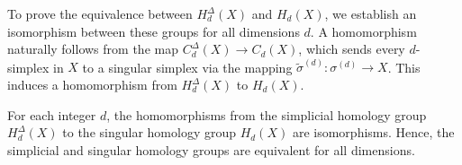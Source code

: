 To prove the equivalence between $H^{\Delta}_{d}(X)$ and $H_{d}(X)$, we establish an isomorphism between these groups for all dimensions $d$. A homomorphism naturally follows from the map $C^{\Delta}_{d}(X) \rightarrow C_{d}(X)$, which sends every $d$-simplex in $X$ to a singular simplex via the mapping $\tilde{\sigma}^{(d)}: \sigma^{(d)}\rightarrow X$. This induces a homomorphism from $H^{\Delta}_{d}(X)$ to $H_{d}(X)$.

\begin{theorem}{\cite[p.102f]{hatcher2005algebraic}}
	For each integer $d$, the homomorphisms from the simplicial homology group
	$H^{\Delta}_{d}(X)$ to the singular homology group $H_{d}(X)$ are isomorphisms.
	Hence, the simplicial and singular homology groups are equivalent for all
	dimensions.
\end{theorem}

